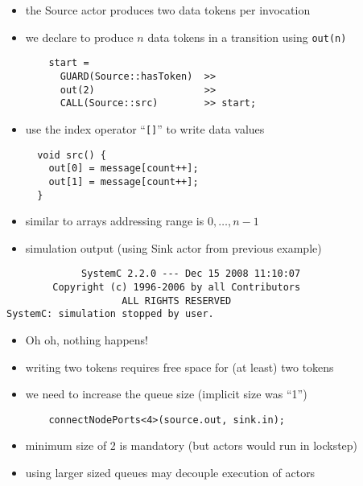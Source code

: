 \begin{frame}[fragile=singleslide]
\begin{itemize}
\item the Source actor produces two data tokens per invocation
\item we declare to produce $n$ data tokens in a transition  using \lstinline!out(n)!
\begin{lstlisting}
    start = 
      GUARD(Source::hasToken)  >>
      out(2)                   >>
      CALL(Source::src)        >> start;
\end{lstlisting}
\item use the index operator ``\lstinline![]!'' to write data values
\begin{lstlisting}
  void src() {
    out[0] = message[count++];
    out[1] = message[count++];
  }
\end{lstlisting}
\item similar to arrays addressing range is $0, \dots, n-1$
\end{itemize}
\end{frame}





\begin{frame}[fragile=singleslide]
\begin{itemize}
\item simulation output (using Sink actor from previous example)
\end{itemize}
\begin{lstlisting}
             SystemC 2.2.0 --- Dec 15 2008 11:10:07
        Copyright (c) 1996-2006 by all Contributors
                    ALL RIGHTS RESERVED
SystemC: simulation stopped by user.
\end{lstlisting}
\begin{itemize}
\item Oh oh, nothing happens!
\item writing two tokens requires free space for (at least) two tokens
\item we need to increase the queue size (implicit size was ``1'')
\begin{lstlisting}
    connectNodePorts<4>(source.out, sink.in);
\end{lstlisting}
\item minimum size of $2$ is mandatory (but actors would run in lockstep)
\item using larger sized queues may decouple execution of actors
\end{itemize}
\end{frame}





